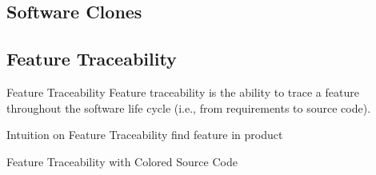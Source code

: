\subsection{Software Clones}
\begin{frame}{\myframetitle}
	\frameSoftwareClones
\end{frame}

\subsection{Feature Traceability}
\begin{frame}{\myframetitle}
	\begin{fancycolumns}[widths={40}]
		\begin{definition}{Feature Traceability}
			Feature traceability is the ability to trace a feature throughout the software life cycle (i.e., from requirements to source code).
		\end{definition}
		\begin{example}{Intuition on Feature Traceability}
			find feature  in product 
		\end{example}
	\nextcolumn
		\begin{exampletight}{Feature Traceability with Colored Source Code}
		\end{exampletight}
	\end{fancycolumns}
\end{frame}


